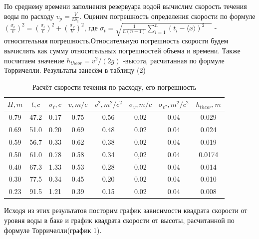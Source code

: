 \documentclass[a4paper,12pt]{article} %
\begin{document}
По среднему времени заполнения резервуара водой вычислим скорость течения воды по расходу $v_p=\frac {V}{tS_1}$. Оценим погрешность определения скорости по формуле $(\frac {\sigma_v}{v})^2=(\frac {\sigma_t}{t})^2+(\frac {\sigma_V}{V})^2$, где ${\sigma_t} = \sqrt{\frac{1}{n(n-1)}\sum_{i=1}^n (t_i-\langle x \rangle)^2\quad}$ - относительная погрешность.Относительную погрешность скорости будем вычислять как сумму относительных погрешностей объема и времени. Также посчитаем значение $h_{theor} = v^2 / (2g)$ -высота, расчитанная по формуле Торричелли. Результаты занесём в таблицу (2)\\

\begin{table}[h]
    \begin{center}
    \begin{tabular}{|c|c|c|c|c|c|c|c|}
    \hline
 $H, m$ & $t, c$ & $\sigma_t, c$ & $v, m/c$ & $v^2, m^2/c^2$ & $\sigma_v , m/c$ & $\sigma_{v^{2}}, m^2/c^2 $ & $h_{theor}, m$\\ \hline 
 0.79 & 47.2 & 0.17 & 0.75 & 0.56 & 0.02 & 0.04 & 0.029\\ \hline
 0.69 & 51.0 & 0.20 & 0.69 & 0.48 & 0.02 & 0.04 & 0.024\\ \hline
 0.59 & 56.7 & 0.33 & 0.62 & 0.38 & 0.02 & 0.04 & 0.019\\ \hline
 0.50 & 61.0 & 0.78 & 0.58 & 0.34 & 0,02 & 0.04 & 0.0174\\ \hline
 0.40 & 67.3 & 1.33 & 0.53 & 0.28 & 0.02 & 0.04 & 0.014\\ \hline
 0.30 & 77.5 & 0.34 & 0.45 & 0.20 & 0.02 & 0.04 & 0.010\\ \hline
 0.23 & 91.5 & 1.21 & 0.39 & 0.15 & 0.02 & 0.04 & 0.008\\ \hline
 \hline
\end{tabular}
\caption{Расчёт скорости течения по расходу, его погрешность}
\end{center}
\end{table}
Исходя из этих результатов посторим график зависимости квадрата скорости от уровня воды в баке и график квадрата скорости от высоты, расчитанной по формуле Торричелли(график 1).
\end{document}
